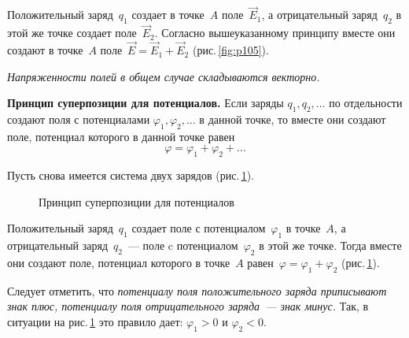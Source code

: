 \documentclass[main.tex]{subfiles}
\begin{document}
Положительный заряд~$q_1$ создает в точке~$A$ поле~$\vec E_1$, а отрицательный заряд~$q_2$ в этой же точке создает поле~$\vec E_2$. Согласно вышеуказанному принципу вместе они создают в точке~$A$ поле~$\vec E=\vec E_1+\vec E_2$ (рис.\,\ref{fig:p105}). 

\emph{Напряженности полей в общем случае складываются векторно.}
%
\begin{law}
\textbf{Принцип суперпозиции для потенциалов.} Если заряды $q_1, q_2,\ldots$ по отдельности создают поля с потенциалами $\varphi_1,\varphi_2,\ldots$ в данной точке, то вместе они создают поле, потенциал которого в данной точке равен
\begin{equation}
    \varphi=\varphi_1+\varphi_2+\ldots
\end{equation}
\end{law}
%
Пусть снова имеется система двух зарядов (рис.\,\ref{fig:p106}).

    \begin{figure}[H]
    \centering

\caption{Принцип суперпозиции для потенциалов}
\label{fig:p106}
\end{figure}

Положительный заряд~$q_1$ создает поле с потенциалом~$\varphi_1$ в точке~$A$, а отрицательный заряд~$q_2$~--- поле c потенциалом~$\varphi_2$ в этой же точке. Тогда вместе они создают поле, потенциал которого в точке~$A$ равен~$\varphi=\varphi_1+\varphi_2$ (рис.\,\ref{fig:p106}). 

Следует отметить, что \emph{потенциалу поля положительного заряда приписывают знак плюс, потенциалу поля отрицательного заряда~--- знак минус.} Так, в ситуации на рис.\,\ref{fig:p106} это правило дает: $\varphi_1>0$ и $\varphi_2<0$. 




 
\end{document}
